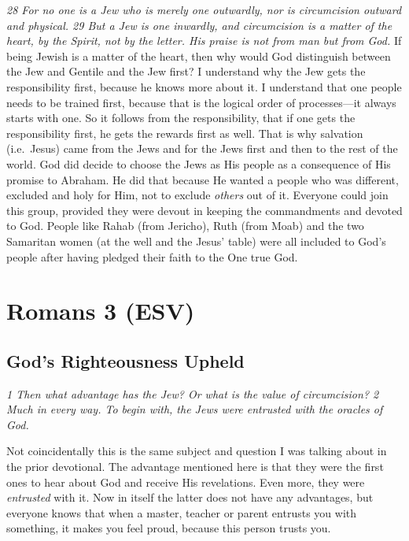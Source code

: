 \emph{28 For no one is a Jew who is merely one outwardly, nor is
circumcision outward and physical. 29 But a Jew is one inwardly, and
circumcision is a matter of the heart, by the Spirit, not by the letter.
His praise is not from man but from God.} If being Jewish is a matter of
the heart, then why would God distinguish between the Jew and Gentile
and the Jew first? I understand why the Jew gets the responsibility
first, because he knows more about it. I understand that one people
needs to be trained first, because that is the logical order of
processes---it always starts with one. So it follows from the
responsibility, that if one gets the responsibility first, he gets the
rewards first as well. That is why salvation (i.e.~Jesus) came from the
Jews and for the Jews first and then to the rest of the world. God did
decide to choose the Jews as His people as a consequence of His promise
to Abraham. He did that because He wanted a people who was different,
excluded and holy for Him, not to exclude \emph{others} out of it.
Everyone could join this group, provided they were devout in keeping the
commandments and devoted to God. People like Rahab (from Jericho), Ruth
(from Moab) and the two Samaritan women (at the well and the Jesus'
table) were all included to God's people after having pledged their
faith to the One true God.



\hypertarget{romans-3-esv}{%
\section{Romans 3 (ESV)}\label{romans-3-esv}}
\vspace{10.5cm}
\subsection{God's Righteousness Upheld} \emph{1 Then what advantage has the
Jew? Or what is the value of circumcision? 2 Much in every way. To begin
with, the Jews were entrusted with the oracles of God.}

Not coincidentally this is the same subject and question I was talking
about in the prior devotional. The advantage mentioned here is that they
were the first ones to hear about God and receive His revelations. Even
more, they were \emph{entrusted} with it. Now in itself the latter does
not have any advantages, but everyone knows that when a master, teacher
or parent entrusts you with something, it makes you feel proud, because
this person trusts you.

